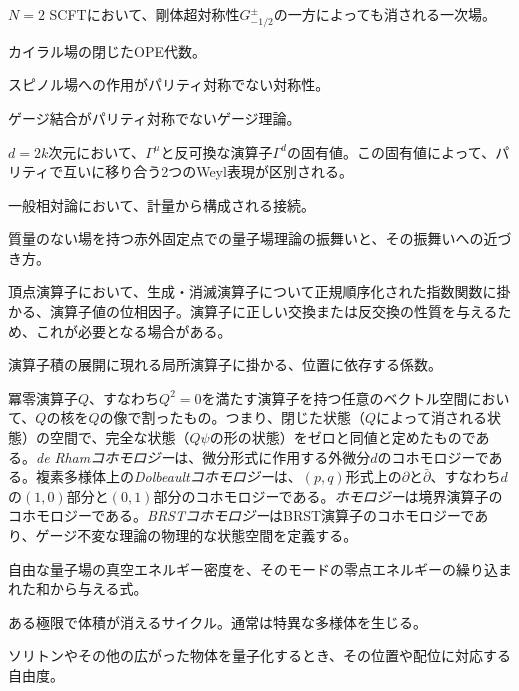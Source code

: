 {$N=2$ SCFTにおいて、剛体超対称性$G^\pm_{-1/2}$の一方によっても消される一次場。}

{カイラル場の閉じたOPE代数。}

{スピノル場への作用がパリティ対称でない対称性。}

{ゲージ結合がパリティ対称でないゲージ理論。}

{$d=2k$次元において、$\Gamma^\mu$と反可換な演算子$\Gamma^d$の固有値。この固有値によって、パリティで互いに移り合う2つのWeyl表現が区別される。}

{一般相対論において、計量から構成される接続。}

{質量のない場を持つ赤外固定点での量子場理論の振舞いと、その振舞いへの近づき方。}


{頂点演算子において、生成・消滅演算子について正規順序化された指数関数に掛かる、演算子値の位相因子。演算子に正しい交換または反交換の性質を与えるため、これが必要となる場合がある。}

{演算子積の展開に現れる局所演算子に掛かる、位置に依存する係数。}

{冪零演算子$Q$、すなわち$Q^2=0$を満たす演算子を持つ任意のベクトル空間において、$Q$の核を$Q$の像で割ったもの。つまり、閉じた状態（$Q$によって消される状態）の空間で、完全な状態（$Q\psi$の形の状態）をゼロと同値と定めたものである。\emph{de Rhamコホモロジー}は、微分形式に作用する外微分$d$のコホモロジーである。複素多様体上の\emph{Dolbeaultコホモロジー}は、$(p,q)$形式上の$\partial$と$\bar\partial$、すなわち$d$の$(1,0)$部分と$(0,1)$部分のコホモロジーである。\emph{ホモロジー}は境界演算子のコホモロジーである。\emph{BRSTコホモロジー}はBRST演算子のコホモロジーであり、ゲージ不変な理論の物理的な状態空間を定義する。}

{自由な量子場の真空エネルギー密度を、そのモードの零点エネルギーの繰り込まれた和から与える式。}

{ある極限で体積が消えるサイクル。通常は特異な多様体を生じる。}

{ソリトンやその他の広がった物体を量子化するとき、その位置や配位に対応する自由度。}

